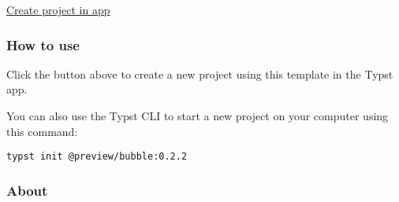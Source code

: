 \begin{Shaded}
\begin{Highlighting}[]

\NormalTok{) }

\end{Highlighting}
\end{Shaded}

\href{/app?template=bubble&version=0.2.2}{Create project in app}

\subsubsection{How to use}\label{how-to-use}

Click the button above to create a new project using this template in
the Typst app.

You can also use the Typst CLI to start a new project on your computer
using this command:

\begin{verbatim}
typst init @preview/bubble:0.2.2
\end{verbatim}



\subsubsection{About}\label{about}


